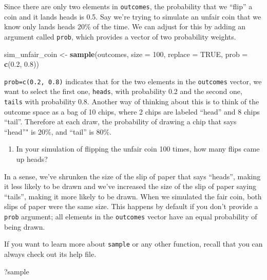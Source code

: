 \documentclass[]{book}
\newenvironment{Shaded}{\begin{snugshade}}{\end{snugshade}}
\newcommand{\KeywordTok}[1]{\textcolor[rgb]{0.13,0.29,0.53}{\textbf{{#1}}}}
\newcommand{\DataTypeTok}[1]{\textcolor[rgb]{0.13,0.29,0.53}{{#1}}}
\newcommand{\DecValTok}[1]{\textcolor[rgb]{0.00,0.00,0.81}{{#1}}}
\newcommand{\FloatTok}[1]{\textcolor[rgb]{0.00,0.00,0.81}{{#1}}}
\newcommand{\StringTok}[1]{\textcolor[rgb]{0.31,0.60,0.02}{{#1}}}
\newcommand{\OtherTok}[1]{\textcolor[rgb]{0.56,0.35,0.01}{{#1}}}
\newcommand{\NormalTok}[1]{{#1}}
\providecommand{\tightlist}{%
  \setlength{\itemsep}{0pt}\setlength{\parskip}{0pt}}
\theoremstyle{definition}
\theoremstyle{definition}
\theoremstyle{remark}
\begin{document}
Since there are only two elements in \texttt{outcomes}, the probability
that we ``flip'' a coin and it lands heads is 0.5. Say we're trying to
simulate an unfair coin that we know only lands heads 20\% of the time.
We can adjust for this by adding an argument called \texttt{prob}, which
provides a vector of two probability weights.

\begin{Shaded}
\begin{Highlighting}[]
\NormalTok{sim_unfair_coin <-}\StringTok{ }\KeywordTok{sample}\NormalTok{(outcomes, }\DataTypeTok{size =} \DecValTok{100}\NormalTok{, }\DataTypeTok{replace =} \OtherTok{TRUE}\NormalTok{, }\DataTypeTok{prob =} \KeywordTok{c}\NormalTok{(}\FloatTok{0.2}\NormalTok{, }\FloatTok{0.8}\NormalTok{))}
\end{Highlighting}
\end{Shaded}

\texttt{prob=c(0.2,\ 0.8)} indicates that for the two elements in the
\texttt{outcomes} vector, we want to select the first one,
\texttt{heads}, with probability 0.2 and the second one, \texttt{tails}
with probability 0.8. Another way of thinking about this is to think of
the outcome space as a bag of 10 chips, where 2 chips are labeled
``head'' and 8 chips ``tail''. Therefore at each draw, the probability
of drawing a chip that says ``head''" is 20\%, and ``tail'' is 80\%.

\begin{enumerate}
\def\labelenumi{\arabic{enumi}.}
\setcounter{enumi}{2}
\tightlist
\item
  In your simulation of flipping the unfair coin 100 times, how many
  flips came up heads?
\end{enumerate}

In a sense, we've shrunken the size of the slip of paper that says
``heads'', making it less likely to be drawn and we've increased the
size of the slip of paper saying ``tails'', making it more likely to be
drawn. When we simulated the fair coin, both slips of paper were the
same size. This happens by default if you don't provide a \texttt{prob}
argument; all elements in the \texttt{outcomes} vector have an equal
probability of being drawn.

If you want to learn more about \texttt{sample} or any other function,
recall that you can always check out its help file.

\begin{Shaded}
\begin{Highlighting}[]
\NormalTok{?sample}
\end{Highlighting}
\end{Shaded}
\end{document}
